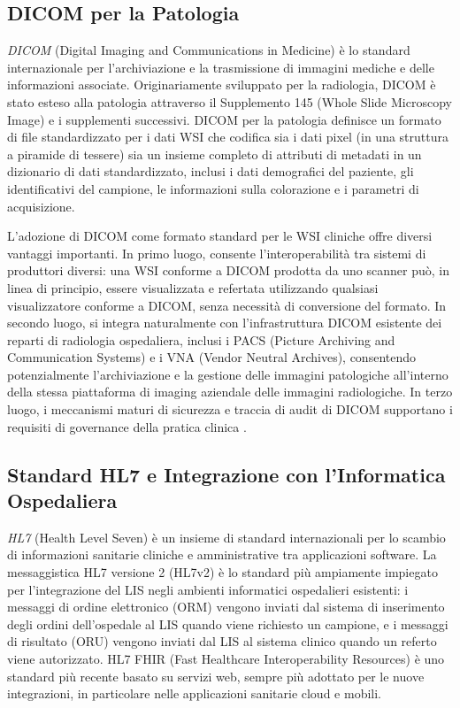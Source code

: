 \subsection{DICOM per la Patologia}

\emph{DICOM} (Digital Imaging and Communications in Medicine) è lo standard internazionale per l'archiviazione e la trasmissione di immagini mediche e delle informazioni associate. Originariamente sviluppato per la radiologia, DICOM è stato esteso alla patologia attraverso il Supplemento 145 (Whole Slide Microscopy Image) e i supplementi successivi. DICOM per la patologia definisce un formato di file standardizzato per i dati WSI che codifica sia i dati pixel (in una struttura a piramide di tessere) sia un insieme completo di attributi di metadati in un dizionario di dati standardizzato, inclusi i dati demografici del paziente, gli identificativi del campione, le informazioni sulla colorazione e i parametri di acquisizione.

L'adozione di DICOM come formato standard per le WSI cliniche offre diversi vantaggi importanti. In primo luogo, consente l'interoperabilità tra sistemi di produttori diversi: una WSI conforme a DICOM prodotta da uno scanner può, in linea di principio, essere visualizzata e refertata utilizzando qualsiasi visualizzatore conforme a DICOM, senza necessità di conversione del formato. In secondo luogo, si integra naturalmente con l'infrastruttura DICOM esistente dei reparti di radiologia ospedaliera, inclusi i PACS (Picture Archiving and Communication Systems) e i VNA (Vendor Neutral Archives), consentendo potenzialmente l'archiviazione e la gestione delle immagini patologiche all'interno della stessa piattaforma di imaging aziendale delle immagini radiologiche. In terzo luogo, i meccanismi maturi di sicurezza e traccia di audit di DICOM supportano i requisiti di governance della pratica clinica \cite{song2023}.

\subsection{Standard HL7 e Integrazione con l'Informatica Ospedaliera}

\emph{HL7} (Health Level Seven) è un insieme di standard internazionali per lo scambio di informazioni sanitarie cliniche e amministrative tra applicazioni software. La messaggistica HL7 versione 2 (HL7v2) è lo standard più ampiamente impiegato per l'integrazione del LIS negli ambienti informatici ospedalieri esistenti: i messaggi di ordine elettronico (ORM) vengono inviati dal sistema di inserimento degli ordini dell'ospedale al LIS quando viene richiesto un campione, e i messaggi di risultato (ORU) vengono inviati dal LIS al sistema clinico quando un referto viene autorizzato. HL7 FHIR (Fast Healthcare Interoperability Resources) è uno standard più recente basato su servizi web, sempre più adottato per le nuove integrazioni, in particolare nelle applicazioni sanitarie cloud e mobili.

